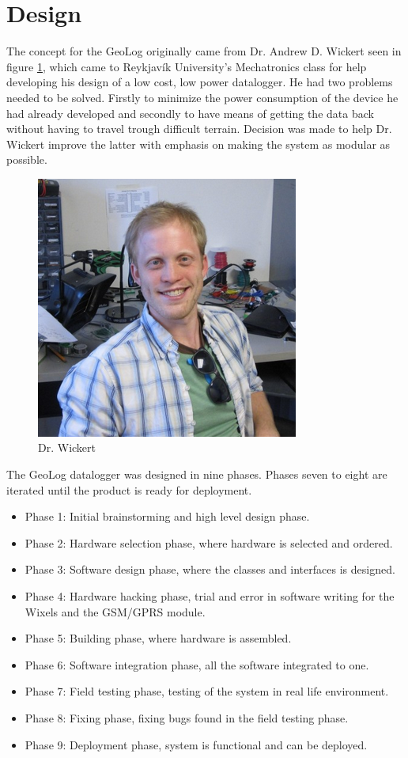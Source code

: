 \section{Design}
The concept for the GeoLog originally came from Dr. Andrew D. Wickert seen in figure 
\ref{fig:andrewWickert}, which came to Reykjavík University's Mechatronics class for 
help developing his design of a low cost, low power datalogger\cite{ALog-BottleLogger}. 
He had two problems needed to be solved. Firstly to minimize the power consumption of the device he had already developed and secondly to have means of getting the data
back without having to travel trough difficult terrain. Decision was made to help Dr. Wickert 
improve the latter with emphasis on making the system as modular as possible. 
\begin{figure}
\centering
\includegraphics[width=0.4\linewidth]{graphics/andrewWickert}
\caption{Dr. Wickert\label{fig:andrewWickert}\cite{andrewWickert}}
\end{figure}
The GeoLog datalogger was designed in nine phases. Phases seven to eight are iterated
until the product is ready for deployment.
\begin{itemize}
    \item{Phase 1:} Initial brainstorming and high level design phase.
    \item{Phase 2:} Hardware selection phase, where hardware is selected and ordered.
    \item{Phase 3:} Software design phase, where the classes and interfaces is designed.
    \item{Phase 4:} Hardware hacking phase, trial and error in software writing for the
                    Wixels\cite{wixel} and the GSM/GPRS module\cite{SM5100B}.
    \item{Phase 5:} Building phase, where hardware is assembled.
    \item{Phase 6:} Software integration phase, all the software integrated to one.
    \item{Phase 7:} Field testing phase, testing of the system in real life environment.
    \item{Phase 8:} Fixing phase, fixing bugs found in the field testing phase.
    \item{Phase 9:} Deployment phase, system is functional and can be deployed. 
\end{itemize}
